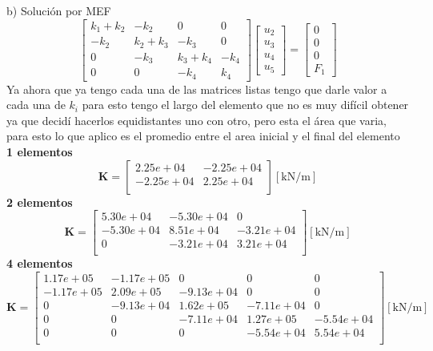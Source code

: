 \begin{desarrollo}{b) Soluci\'on por MEF}
$$\begin{bmatrix}
    k_1+k_2&-k_2&0&0\\
    -k_2&k_2+k_3&-k_3&0\\
    0&-k_3&k_3+k_4&-k_4\\
    0&0&-k_4&k_4
    
\end{bmatrix}\begin{bmatrix}
    u_2\\
    u_3\\
    u_4\\
    u_5
\end{bmatrix}=\begin{bmatrix}
    0\\
    0\\
    0\\
    F_1
\end{bmatrix}$$
Ya ahora que ya tengo cada una de las matrices listas tengo que darle valor a cada una de $k_i$ para esto tengo el largo del elemento que no es muy difícil obtener ya que decidí hacerlos equidistantes uno con otro, pero esta el área que varia, para esto lo que aplico es el promedio entre el area inicial y el final del elemento\\

\textbf{1 elementos}
\begin{equation}
\mathbf{K} = \begin{bmatrix}
2.25e+04 & -2.25e+04 \\
-2.25e+04 & 2.25e+04 \\
\end{bmatrix}[\text{kN/m}]
\end{equation}
\textbf{2 elementos}
\begin{equation}
\mathbf{K} = \begin{bmatrix}
5.30e+04 & -5.30e+04 & 0 \\
-5.30e+04 & 8.51e+04 & -3.21e+04 \\
0 & -3.21e+04 & 3.21e+04 \\
\end{bmatrix}[\text{kN/m}]
\end{equation}
\textbf{4 elementos}
\begin{equation}
\mathbf{K} = \begin{bmatrix}
1.17e+05 & -1.17e+05 & 0 & 0 & 0 \\
-1.17e+05 & 2.09e+05 & -9.13e+04 & 0 & 0 \\
0 & -9.13e+04 & 1.62e+05 & -7.11e+04 & 0 \\
0 & 0 & -7.11e+04 & 1.27e+05 & -5.54e+04 \\
0 & 0 & 0 & -5.54e+04 & 5.54e+04 \\
\end{bmatrix}[\text{kN/m}]
\end{equation}


\end{desarrollo}
